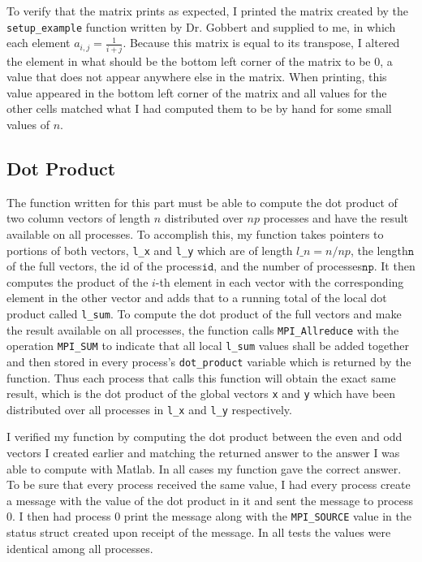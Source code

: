 \documentclass[11pt]{article}
\begin{document}
To verify that the matrix prints as expected, I printed the matrix created by the \texttt{setup\_example} function written by Dr. Gobbert and supplied to me, in which each element $a_{i,j}=\frac{1}{i+j}$. Because this matrix is equal to its transpose, I altered the element in what should be the bottom left corner of the matrix to be $ 0 $, a value that does not appear anywhere else in the matrix. When printing, this value appeared in the bottom left corner of the matrix and all values for the other cells matched what I had computed them to be by hand for some small values of $n$.

\subsection{Dot Product}
The function written for this part must be able to compute the dot product of two column vectors of length $ n $ distributed over $ np $ processes and have the result available on all processes. To accomplish this, my function takes pointers to portions of both vectors, \texttt{l\_x} and \texttt{l\_y} which are of length $ l\_n = n / np $, the length\(\texttt{n}\) of the full vectors, the id of the process\(\texttt{id}\), and the number of processes\(\texttt{np}\). It then computes the product of the $i$-th element in each vector with the corresponding element in the other vector and adds that to a running total of the local dot product called \texttt{l\_sum}. To compute the dot product of the full vectors and make the result available on all processes, the function calls \texttt{MPI\_Allreduce} with the operation \texttt{MPI\_SUM} to indicate that all local \texttt{l\_sum} values shall be added together and then stored in every process's \texttt{dot\_product} variable which is returned by the function. Thus each process that calls this function will obtain the exact same result, which is the dot product of the global vectors \texttt{x} and \texttt{y} which have been distributed over all processes in \texttt{l\_x} and \texttt{l\_y} respectively.

I verified my function by computing the dot product between the even and odd vectors I created earlier and matching the returned answer to the answer I was able to compute with Matlab. In all cases my function gave the correct answer. To be sure that every process received the same value, I had every process create a message with the value of the dot product in it and sent the message to process $0$. I then had process $0$ print the message along with the \texttt{MPI\_SOURCE} value in the status struct created upon receipt of the message. In all tests the values were identical among all processes.
\end{document}

